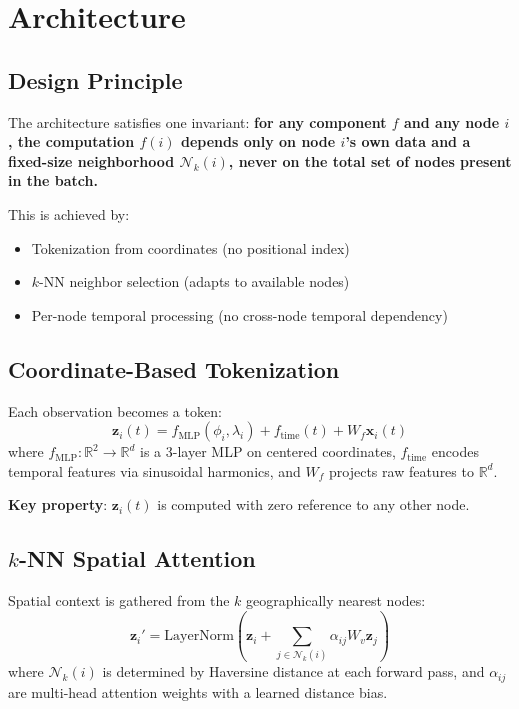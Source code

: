 \documentclass[journal]{IEEEtran}
\begin{document}
\section{Architecture}
\label{sec:architecture}

\subsection{Design Principle}

The architecture satisfies one invariant: \textbf{for any component $f$ and any node $i$, the computation $f(i)$ depends only on node $i$'s own data and a fixed-size neighborhood $\mathcal{N}_k(i)$, never on the total set of nodes present in the batch.}

This is achieved by:
\begin{itemize}
\item Tokenization from coordinates (no positional index)
\item $k$-NN neighbor selection (adapts to available nodes)
\item Per-node temporal processing (no cross-node temporal dependency)
\end{itemize}

\subsection{Coordinate-Based Tokenization}

Each observation becomes a token:
\begin{equation}
\mathbf{z}_i(t) = f_{\text{MLP}}(\phi_i, \lambda_i) + f_{\text{time}}(t) + W_f \mathbf{x}_i(t)
\end{equation}
where $f_{\text{MLP}}: \mathbb{R}^2 \to \mathbb{R}^d$ is a 3-layer MLP on centered coordinates, $f_{\text{time}}$ encodes temporal features via sinusoidal harmonics, and $W_f$ projects raw features to $\mathbb{R}^d$.

\textbf{Key property}: $\mathbf{z}_i(t)$ is computed with zero reference to any other node.

\subsection{$k$-NN Spatial Attention}

Spatial context is gathered from the $k$ geographically nearest nodes:
\begin{equation}
\mathbf{z}_i' = \text{LayerNorm}\left(\mathbf{z}_i + \sum_{j \in \mathcal{N}_k(i)} \alpha_{ij} W_v \mathbf{z}_j\right)
\end{equation}
where $\mathcal{N}_k(i)$ is determined by Haversine distance at each forward pass, and $\alpha_{ij}$ are multi-head attention weights with a learned distance bias.
\end{document}
